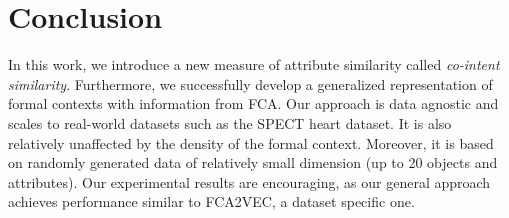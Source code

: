 

\section{Conclusion}
In this work, we introduce a new measure of attribute similarity called \textit{co-intent similarity}.
Furthermore, we successfully develop a generalized representation of formal contexts with information from FCA.
Our approach is data agnostic and scales to real-world datasets such as the SPECT heart dataset.
It is also relatively unaffected by the density of the formal context.
Moreover, it is based on randomly generated data of relatively small dimension (up to 20 objects and attributes).
%
Our experimental results are encouraging, as our general approach achieves performance similar to FCA2VEC, a dataset specific one.
